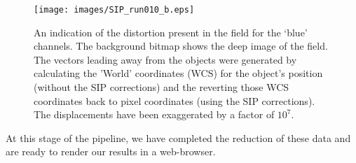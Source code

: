 \begin{figure}
  \centering
  \texttt{[image: images/SIP\_run010\_b.eps]}
  \caption{An indication of the distortion present in the field for the `blue' channels. The background bitmap shows the deep image of the field. The vectors leading away from the objects were generated by calculating the 'World' coordinates (WCS) for the object's position (without the SIP corrections) and the reverting those WCS coordinates back to pixel coordinates (using the SIP corrections). The displacements have been exaggerated by a factor of $10^7$.}
\label{fig:sipfitb}
\end{figure}


At this stage of the pipeline, we have completed the reduction of these data and are ready to render our results in a web-browser.
